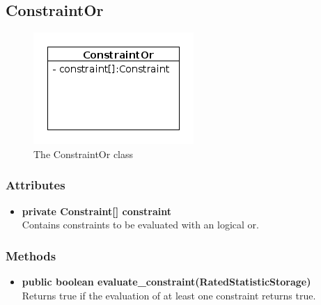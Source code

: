 \subsection{ConstraintOr}
\begin{figure}[htbp]
	\begin{minipage}[t]{8cm}
		\vspace{0pt}
		\centering
		\includegraphics[scale=0.6]{./diagram_pictures/reactor/ConstraintOr.png}
		\caption{The ConstraintOr class}
	\end{minipage}
	\hfill
	\begin{minipage}[t]{8cm}
		\vspace{10pt}
			
	\end{minipage}
\end{figure}  

\subsubsection{Attributes}
\begin{itemize}
	\item \textbf{ private Constraint[] constraint }\\
	Contains constraints to be evaluated with an logical or.
\end{itemize}
\subsubsection{Methods}
\begin{itemize}
	\item \textbf{ public boolean evaluate\_constraint(RatedStatisticStorage) }\\
	Returns true if the evaluation of at least one constraint returns true.
\end{itemize}


\newpage
